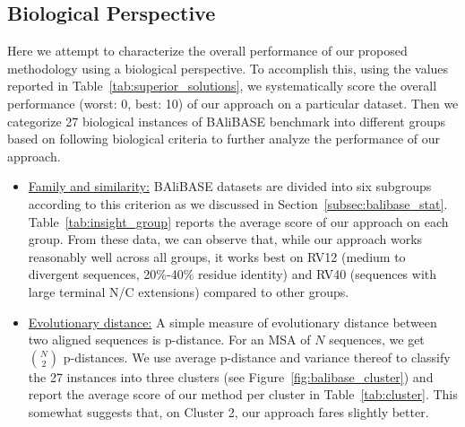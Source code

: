 \subsection{Biological Perspective}\label{sec:cyb-biology-discussion}
Here we attempt to characterize the overall performance of our proposed methodology using a biological perspective. To accomplish this, using the values reported in Table~\ref{tab:superior_solutions}, we systematically score the overall performance (worst: 0, best: 10) of our approach on a particular dataset. Then we categorize 27 biological instances of BAliBASE benchmark into different groups based on following biological criteria to further analyze the performance of our approach.
\begin{itemize}
	\item \underline{Family and similarity:} BAliBASE datasets are divided into six subgroups according to this criterion as we discussed in Section~\ref{subsec:balibase_stat}. Table~\ref{tab:insight_group} reports the average score of our approach on each group. From these data, we can observe that, while our approach works
	reasonably well across 
	all groups, it works best on RV12 (medium to divergent sequences, 20\%-40\% residue identity) and RV40 (sequences with large terminal N/C extensions) compared to other groups.
	
	\item \underline{Evolutionary distance:} A simple measure of evolutionary distance between two aligned sequences is p-distance. For an MSA of $N$ sequences, we get $N \choose 2$ p-distances. We use average p-distance and variance thereof to classify the 27 instances into three clusters (see Figure~\ref{fig:balibase_cluster}) and report the average score of our method per cluster in Table~\ref{tab:cluster}. This somewhat suggests that, on Cluster 2, our approach fares slightly better.
	
	
	
\end{itemize} 

